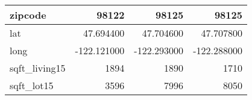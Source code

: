 \begin{table}[H]
\begin{tabular}{|l|r|r|r|}
\hline zipcode & \cellcolor[rgb]{0.9, 0.54, 0.52} 98122 & 98125 & 98125 \\
\hline lat & \cellcolor[rgb]{0.9, 0.54, 0.52} 47.694400 & 47.704600 & 47.707800 \\
\hline long & \cellcolor[rgb]{0.9, 0.54, 0.52} -122.121000 & \cellcolor[rgb]{0.9, 0.54, 0.52} -122.293000 & \cellcolor[rgb]{0.9, 0.54, 0.52} -122.288000 \\
\hline sqft\_living15 & \cellcolor[rgb]{0.9, 0.54, 0.52} 1894 & 1890 & 1710 \\
\hline sqft\_lot15 & \cellcolor[rgb]{0.9, 0.54, 0.52} 3596 & 7996 & 8050 \\
\hline
\end{tabular}
\end{table}
